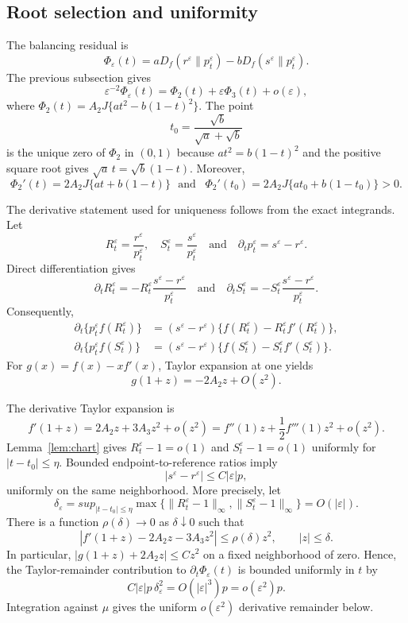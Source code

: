 \documentclass[11pt]{article}
\theoremstyle{plain}
\theoremstyle{definition}
\theoremstyle{definition}
\newcommand{\eps}{\varepsilon}
\begin{document}
\subsection{Root selection and uniformity}

The balancing residual is
\[
\Phi_\eps(t)=aD_f(r^\eps\|p_t^\eps)-bD_f(s^\eps\|p_t^\eps).
\]
The previous subsection gives
\[
\eps^{-2}\Phi_\eps(t)=\Phi_2(t)+\eps\Phi_3(t)+o(\eps),
\]
where $\Phi_2(t)=A_2J\{at^2-b(1-t)^2\}$.
The point
\[
t_0=\frac{\sqrt b}{\sqrt a+\sqrt b}
\]
is the unique zero of $\Phi_2$ in $(0,1)$ because $at^2=b(1-t)^2$ and the positive square root gives $\sqrt a\,t=\sqrt b(1-t)$. Moreover,
\[
\Phi_2'(t)=2A_2J\{at+b(1-t)\} \,\,\,\,\text{and}\,\,\,\,\,
\Phi_2'(t_0)=2A_2J\{at_0+b(1-t_0)\}>0.
\]

The derivative statement used for uniqueness follows from the exact integrands. Let
\[
R_t^\eps=\frac{r^\eps}{p_t^\eps},
\quad
S_t^\eps=\frac{s^\eps}{p_t^\eps}
\quad\text{and}\quad
\partial_t p_t^\eps=s^\eps-r^\eps.
\]
Direct differentiation gives
\[
\partial_t R_t^\eps
=-R_t^\eps\frac{s^\eps-r^\eps}{p_t^\eps}
\quad\text{and}\quad
\partial_t S_t^\eps
=-S_t^\eps\frac{s^\eps-r^\eps}{p_t^\eps}.
\]
Consequently,
\[
\begin{aligned}
\partial_t\{p_t^\eps f(R_t^\eps)\}
&=(s^\eps-r^\eps)\{f(R_t^\eps)-R_t^\eps f'(R_t^\eps)\},\\
\partial_t\{p_t^\eps f(S_t^\eps)\}
&=(s^\eps-r^\eps)\{f(S_t^\eps)-S_t^\eps f'(S_t^\eps)\}.
\end{aligned}
\]
For $g(x)=f(x)-xf'(x)$, Taylor expansion at one yields
\[
g(1+z)=-2A_2z+O(z^2).
\]

The derivative Taylor expansion is
\[
f'(1+z)=2A_2z+3A_3z^2+o(z^2)
=f''(1)z+\frac12f'''(1)z^2+o(z^2).
\]
Lemma~\ref{lem:chart} gives $R_t^\eps-1=o(1)$ and $S_t^\eps-1=o(1)$ uniformly for $|t-t_0|\le\eta$. Bounded endpoint-to-reference ratios imply
\[
|s^\eps-r^\eps|\le C|\eps|p,
\]
uniformly on the same neighborhood. More precisely, let
\[
\delta_\eps=sup_{|t-t_0|\le\eta}
\max\{\|R_t^\eps-1\|_\infty,\|S_t^\eps-1\|_\infty\}=O(|\eps|).
\]
There is a function $\rho(\delta)\to0$ as $\delta\downarrow0$ such that
\[
|f'(1+z)-2A_2z-3A_3z^2|\le \rho(\delta)z^2,
\qquad |z|\le\delta.
\]
In particular, $|g(1+z)+2A_2z|\le Cz^2$ on a fixed neighborhood of zero. Hence, the Taylor-remainder contribution to $\partial_t\Phi_\eps(t)$ is bounded uniformly in $t$ by
\[
C|\eps|p\,\delta_\eps^2=O(|\eps|^3)p=o(\eps^2)p.
\]
Integration against $\mu$ gives the uniform $o(\eps^2)$ derivative remainder below.
\end{document}
